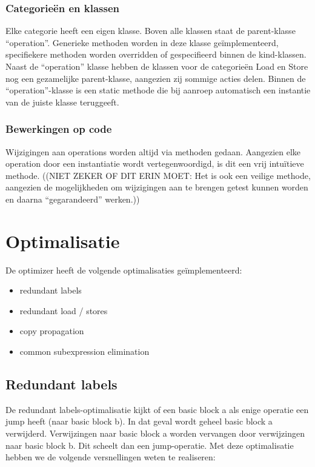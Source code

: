 \documentclass[a4paper,10pt]{article}
\begin{document}
\subsubsection{Categorie\"en en klassen}
Elke categorie heeft een eigen klasse. Boven alle klassen staat de
parent-klasse ``operation''. Generieke methoden worden in deze klasse
ge\"implementeerd, specifiekere methoden worden overridden of gespecifieerd
binnen de kind-klassen. Naast de ``operation'' klasse hebben de klassen voor de
categorie\"en Load en Store nog een gezamelijke parent-klasse, aangezien zij
sommige acties delen. Binnen de ``operation''-klasse is een static methode die
bij aanroep automatisch een instantie van de juiste klasse teruggeeft.

\subsubsection{Bewerkingen op code}
Wijzigingen aan operations worden altijd via methoden gedaan. Aangezien elke
operation door een instantiatie wordt vertegenwoordigd, is dit een vrij
intu\"itieve methode. ((NIET ZEKER OF DIT ERIN MOET: Het is ook een veilige
methode, aangezien de mogelijkheden om wijzigingen aan te brengen getest kunnen
worden en daarna ``gegarandeerd'' werken.))

\section{Optimalisatie}
De optimizer heeft de volgende optimalisaties ge\"implementeerd:
\begin{itemize}
\item redundant labels
\item redundant load / stores
\item copy propagation
\item common subexpression elimination
\end{itemize}

\subsection{Redundant labels}
De redundant labels-optimalisatie kijkt of een basic block a als enige
operatie een jump heeft (naar basic block b). In dat geval wordt geheel basic
block a verwijderd. Verwijzingen naar basic block a worden vervangen door
verwijzingen naar basic block b. Dit scheelt dan een jump-operatie.
Met deze optimalisatie hebben we de volgende versnellingen weten te 
realiseren:
\end{document}
